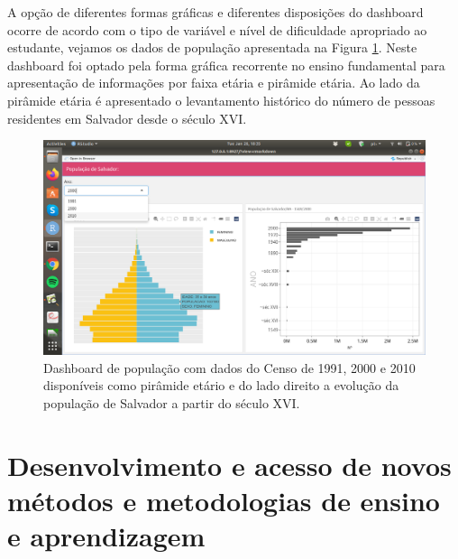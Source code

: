 \documentclass[
]{book}
\begin{document}
A opção de diferentes formas gráficas e diferentes disposições do dashboard ocorre de acordo com o tipo de variável e nível de dificuldade apropriado ao estudante, vejamos os dados de população apresentada na Figura \ref{fig:dashm5cossa}. Neste dashboard foi optado pela forma gráfica recorrente no ensino fundamental para apresentação de informações por faixa etária e pirâmide etária. Ao lado da pirâmide etária é apresentado o levantamento histórico do número de pessoas residentes em Salvador desde o século XVI.

\begin{figure}
\includegraphics[width=18.97in]{images/image51} \caption{Dashboard de população com dados do Censo de 1991, 2000 e 2010 disponíveis como pirâmide etário e do lado direito a evolução da população de Salvador a partir do século XVI.}\label{fig:dashm5cossa}
\end{figure}

\hypertarget{ensaprend}{%
\chapter{Desenvolvimento e acesso de novos métodos e metodologias de ensino e aprendizagem}\label{ensaprend}}
\end{document}
